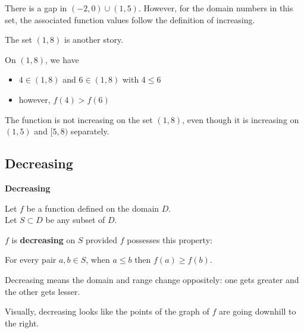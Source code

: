 \documentclass{ximera}
\begin{document}
There is a gap in $(-2,0) \cup (1,5)$.  However, for the domain numbers in this set, the associated function values follow the definition of increasing.   

The set $(1,8)$ is another story.


On $(1,8)$, we have 

\begin{itemize}
\item $4 \in (1,8)$  and  $6 \in (1,8)$  with $4 \leq 6$ \\

\item however, $f(4) > f(6)$
\end{itemize}


The function is not increasing on the set $(1,8)$, even though it is increasing on $(1,5)$ and $[5,8)$ separately. \\












\newpage

\subsection*{Decreasing}



\begin{definition} \textbf{\textcolor{green!50!black}{Decreasing}} 


Let $f$ be a function defined on the domain $D$. \\
Let $S \subset D$ be any subset of $D$.

$f$ is \textbf{decreasing} on $S$ provided $f$ possesses this property:  


\begin{center}
For every pair $a, b \in S$, when $a \leq b$ then $f(a) \geq f(b)$.
\end{center}

\end{definition}




\begin{idea}
Decreasing means the domain and range change oppositely: one gets greater and the other gets lesser.
\end{idea}


\begin{observation}
Visually, decreasing looks like the points of the graph of $f$ are going downhill to the right.
\end{observation}
\end{document}
